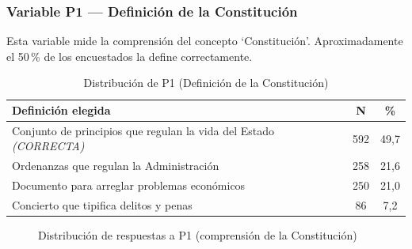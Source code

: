 \documentclass[12pt,a4paper]{article}
\newcommand{\thead}[1]{\cellcolor{tableheader}\color{white}\textbf{#1}}
\begin{document}
\subsubsection{Variable P1 — Definición de la Constitución}

Esta variable mide la comprensión del concepto `Constitución'. Aproximadamente el 50\,\% de los encuestados la define correctamente.

\begin{table}[H]
\centering
\renewcommand{\arraystretch}{1.3}
\begin{tabularx}{\linewidth}{X c c}
\toprule
\thead{Definición elegida} & \thead{N} & \thead{\%} \\
\midrule
Conjunto de principios que regulan la vida del Estado \textit{(CORRECTA)} & 592 & 49,7 \\
\rowcolor{tablerow}
Ordenanzas que regulan la Administración & 258 & 21,6 \\
Documento para arreglar problemas económicos & 250 & 21,0 \\
\rowcolor{tablerow}
Concierto que tipifica delitos y penas & 86 & 7,2 \\
\bottomrule
\end{tabularx}
\caption{Distribución de P1 (Definición de la Constitución)}
\end{table}

\begin{figure}[H]
\centering
{}
\caption{Distribución de respuestas a P1 (comprensión de la Constitución)}
\end{figure}
\end{document}
